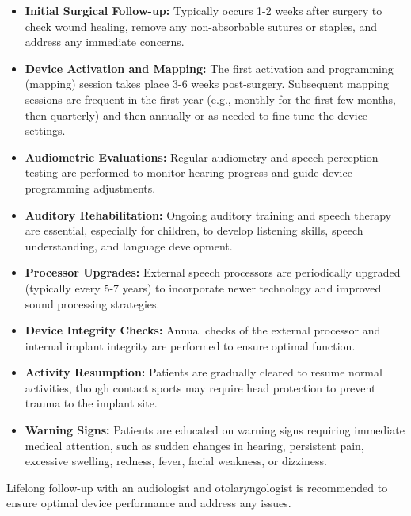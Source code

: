 \begin{itemize}
  \item \textbf{Initial Surgical Follow-up:} Typically occurs 1-2 weeks after surgery to check wound healing, remove any non-absorbable sutures or staples, and address any immediate concerns.
  \item \textbf{Device Activation and Mapping:} The first activation and programming (mapping) session takes place 3-6 weeks post-surgery. Subsequent mapping sessions are frequent in the first year (e.g., monthly for the first few months, then quarterly) and then annually or as needed to fine-tune the device settings.
  \item \textbf{Audiometric Evaluations:} Regular audiometry and speech perception testing are performed to monitor hearing progress and guide device programming adjustments.
  \item \textbf{Auditory Rehabilitation:} Ongoing auditory training and speech therapy are essential, especially for children, to develop listening skills, speech understanding, and language development.
  \item \textbf{Processor Upgrades:} External speech processors are periodically upgraded (typically every 5-7 years) to incorporate newer technology and improved sound processing strategies.
  \item \textbf{Device Integrity Checks:} Annual checks of the external processor and internal implant integrity are performed to ensure optimal function.
  \item \textbf{Activity Resumption:} Patients are gradually cleared to resume normal activities, though contact sports may require head protection to prevent trauma to the implant site.
  \item \textbf{Warning Signs:} Patients are educated on warning signs requiring immediate medical attention, such as sudden changes in hearing, persistent pain, excessive swelling, redness, fever, facial weakness, or dizziness.
\end{itemize}
Lifelong follow-up with an audiologist and otolaryngologist is recommended to ensure optimal device performance and address any issues.

